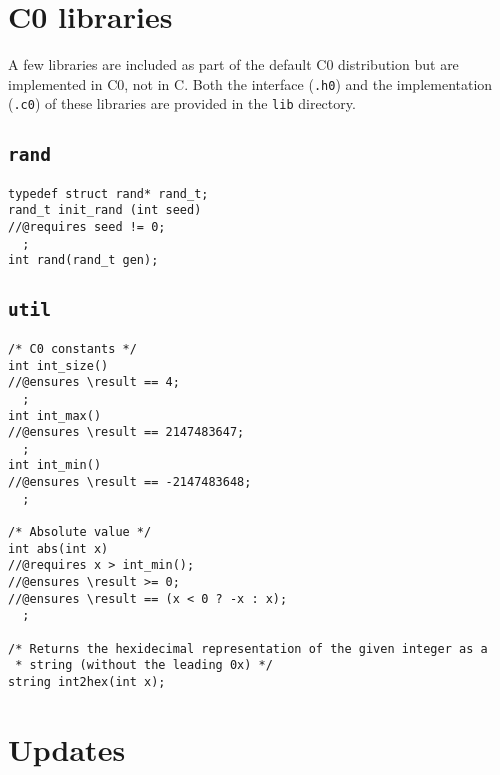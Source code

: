 \documentclass[11pt]{article}
\begin{document}
\section{C0 libraries}

A few libraries are included as part of the default C0 distribution
but are implemented in C0, not in C. Both the interface (\verb'.h0')
and the implementation (\verb'.c0') of these libraries are provided in
the \verb'lib' directory.

\subsection{\tt rand}

\begin{small}
\begin{verbatim}
typedef struct rand* rand_t;
rand_t init_rand (int seed)
//@requires seed != 0;
  ;
int rand(rand_t gen);
\end{verbatim}
\end{small}

\subsection{\tt util}

\begin{small}
\begin{verbatim}
/* C0 constants */
int int_size()
//@ensures \result == 4;
  ;
int int_max()
//@ensures \result == 2147483647;
  ;
int int_min()
//@ensures \result == -2147483648;
  ;

/* Absolute value */
int abs(int x)
//@requires x > int_min();
//@ensures \result >= 0;
//@ensures \result == (x < 0 ? -x : x);
  ;

/* Returns the hexidecimal representation of the given integer as a
 * string (without the leading 0x) */ 
string int2hex(int x);
\end{verbatim}
\end{small}

\section{Updates}
\label{sec:updates}
\hypertarget{sec:updates}{}
\end{document}
